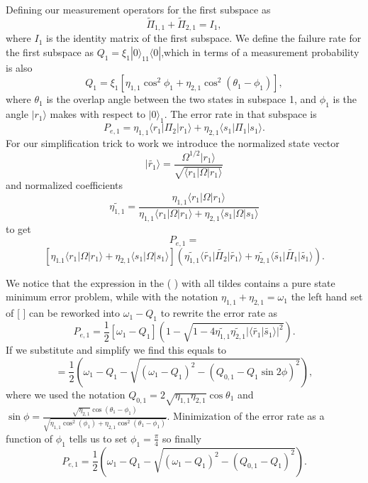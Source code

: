 \documentclass[12pt,oneside,english,reqno]{amsbook}
\numberwithin{section}{chapter}
\numberwithin{equation}{section}
\numberwithin{figure}{section}
\newcommand{\br}[1]{\langle #1|}
\newcommand{\ke}[1]{|#1\rangle}
\begin{document}
Defining our measurement operators for the first subspace as
\begin{equation} \widetilde \Pi_{1,1} + \widetilde \Pi_{2,1} = I_1,\end{equation}
where $I_1$ is the identity matrix of the first subspace.  We define the failure rate for the first subspace as $Q_1 = \xi_1 \ke 0_{11} \br 0 $,which in terms of a measurement probability is also
\begin{equation} Q_1 = \xi_1 [ \eta_{1,1} \cos^2 \phi_1 + \eta_{2,1} \cos^2 (\theta_1 - \phi_1)],\end{equation}
where $\theta_1 $ is the overlap angle between the two states in subspace 1, and $\phi_1$ is the angle $\ke {r_1}$ makes with respect to $\vert 0 \rangle_1$.  The error rate in that subspace is
\begin{equation}P_{e,1} = \eta_{1,1} \langle r_1 \vert \Pi_2 \vert r_1 \rangle + \eta_{2,1} \langle s_1 \vert \Pi_1 \vert s_1 \rangle. \end{equation}
For our simplification trick to work we introduce the normalized state vector \begin{equation} \vert \widetilde{r_1} \rangle  = \frac{ \Omega^{1/2} \vert r_1 \rangle}{\sqrt{\langle r_1 \vert \Omega \vert r_1 \rangle}} \end{equation}
and normalized coefficients
\begin{equation} \widetilde{\eta_{1,1}} = \frac{\eta_{1,1} \langle r_1 \vert \Omega \vert r_1 \rangle}{\eta_{1,1} \langle r_1 \vert \Omega \vert r_1 \rangle + \eta_{2,1} \langle s_1 \vert \Omega \vert s_1 \rangle}\end{equation}
to get 
\[P_{e,1}= \]
\[ [\eta_{1.1} \langle r_1 \vert \Omega \vert r_1 \rangle + \eta_{2,1}\langle s_1 \vert \Omega \vert s_1 \rangle](\widetilde{\eta_{1,1}}\langle\widetilde{r_1} \vert \widetilde{\Pi_2} \vert \widetilde{r_1} \rangle + \widetilde{\eta_{2,1}} \langle \widetilde{s_1} \vert \widetilde{\Pi_1} \vert \widetilde{s_1}\rangle ).\]

We notice that the expression in the ( ) with all tildes contains a pure state minimum error problem, while with the notation $ \eta_{1,1} +\eta_{2,1} = \omega_1$ the left hand set of [ ]  can be reworked into $\omega_1 - Q_1 $ to rewrite the error rate as
\[ P_{e,1}= \frac{1}{2} [\omega_1 - Q_1] (1- \sqrt{1 - 4 \widetilde{\eta_{1,1}} \widetilde{\eta_{2,1}} \vert \langle \widetilde{r_1} \vert \widetilde{s_1} \rangle \vert ^2 }). \]
If we substitute and simplify we find this equals to
\[=\frac{1}{2} ( \omega_1 - Q_1 - \sqrt{ ( \omega_1 - Q_1)^2 -(Q_{0,1} - Q_1 \sin 2 \phi )^2}),\]
where we used the notation $Q_{0,1} = 2 \sqrt{\eta_{1,1}\eta_{2,1}} \cos \theta_1$ and 
 $ \sin \phi = \frac{ \sqrt {\eta_{2,1}} \cos (\theta_1 - \phi_1)}{\sqrt{ \eta_{1,1} \cos^2 (\phi_1)+ \eta_{2,1} \cos^2 (\theta_1 - \phi_1)}}$.  Minimization of the error rate as a function of $\phi_1$ tells us to set $\phi_1 =\frac{\pi}{4}$ so finally
\begin{equation}P_{e,1} = \frac{1}{2} ( \omega_1 - Q_1 - \sqrt{ ( \omega_1 - Q_1)^2 -(Q_{0,1} - Q_1 )^2}).\end{equation}
\end{document}
